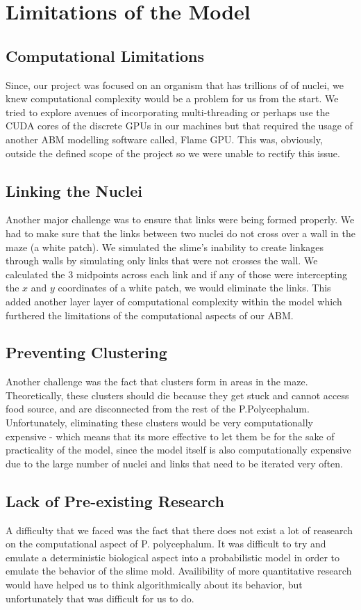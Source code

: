 \documentclass[a4paper, 12pt]{article}
\begin{document}
\section{Limitations of the Model}
\subsection{Computational Limitations}
Since, our project was focused on an organism that has trillions of of nuclei, we knew computational complexity would be a problem for us from the start. We tried to explore avenues of incorporating multi-threading or perhaps use the CUDA cores of the discrete GPUs in our machines but that required the usage of another ABM modelling software called, Flame GPU. This was, obviously, outside the defined scope of the project so we were unable to rectify this issue.
\subsection{Linking the Nuclei}
Another major challenge was to ensure that links were being formed properly. We had to make sure that the links between two nuclei do not cross over a wall in the maze (a white patch). We simulated the slime's inability to create linkages through walls by simulating only links that were not crosses the wall. We calculated the 3 midpoints across each link and if any of those were intercepting the $x$ and $y$ coordinates of a white patch, we would eliminate the links. This added another layer layer of computational complexity within the model which furthered the limitations of the computational aspects of our ABM. 
\subsection{Preventing Clustering}
Another challenge was the fact that clusters form in areas in the maze. Theoretically, these clusters should die because they get stuck and cannot access food source, and are disconnected from the rest of the P.Polycephalum. Unfortunately, eliminating these clusters would be very computationally expensive - which means that its more effective to let them be for the sake of practicality of the model, since the model itself is also computationally expensive due to the large number of nuclei and links that need to be iterated very often.  

\subsection{Lack of Pre-existing Research}
A difficulty that we faced was the fact that there does not exist a lot of reasearch on the computational aspect of P. polycephalum. It was difficult to try and emulate a deterministic biological aspect into a probabilistic model in order to emulate the behavior of the slime mold. Availibility of more quantitative research would have helped us to think algorithmically about its behavior, but unfortunately that was difficult for us to do.   
\newpage
\end{document}
